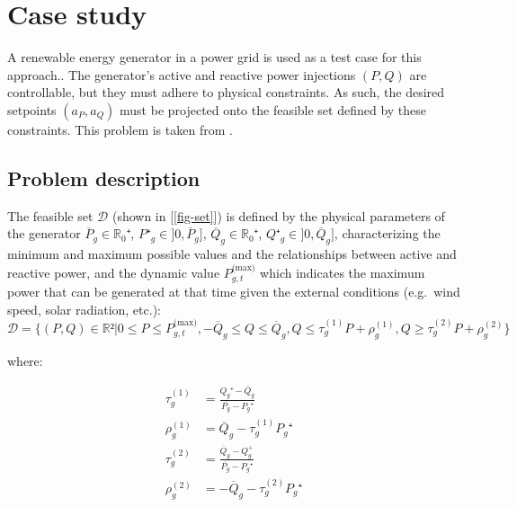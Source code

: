\documentclass[
]{article}
\begin{document}
\section{Case study}\label{case-study}

A renewable energy generator in a power grid is used as a test case for
this approach.. The generator's active and reactive power injections
\((P,Q)\) are controllable, but they must adhere to physical
constraints. As such, the desired setpoints \((a_P, a_Q)\) must be
projected onto the feasible set defined by these constraints. This
problem is taken from \autocite{henryGymANMReinforcementLearning2021}.

\subsection{Problem description}\label{problem-description}

The feasible set \(\mathcal{D}\) (shown in {[}\ref{fig-set}{]}) is
defined by the physical parameters of the generator
\(\overline{P}_g \in \mathbb{R}_0⁺\), \(P⁺_g \in ]0, \overline{P}_g]\),
\(\overline{Q}_g \in \mathbb{R}_0⁺\), \(Q⁺_g \in ]0, \overline{Q}_g]\),
characterizing the minimum and maximum possible values and the
relationships between active and reactive power, and the dynamic value
\(P^{\textrm{(max)}}_{g,t}\) which indicates the maximum power that can
be generated at that time given the external conditions (e.g.~wind
speed, solar radiation, etc.): \begin{equation}
\mathcal{D} = \{(P, Q) \in \mathbb{R}² | 0 \leq P \leq P^{\textrm{(max)}}_{g,t}, -\overline{Q}_g \leq Q \leq \overline{Q}_g, Q \leq \tau^{(1)}_g P + \rho_g^{(1)}, Q \geq \tau^{(2)}_g P + \rho_g^{(2)}\}
\end{equation}

where:

\begin{align}
    \tau^{(1)}_g &= \frac{Q_g⁺ - \overline{Q}_g}{\overline{P_g} - P_g⁺}\\
    \rho^{(1)}_g &= \overline{Q}_g - \tau^{(1)}_gP_g⁺\\
    \tau^{(2)}_g &= \frac{\overline{Q}_g -Q_g^+ }{\overline{P_g} - P_g⁺}\\
    \rho^{(2)}_g &= -\overline{Q}_g - \tau^{(2)}_gP_g⁺  \\
\end{align}
\end{document}
